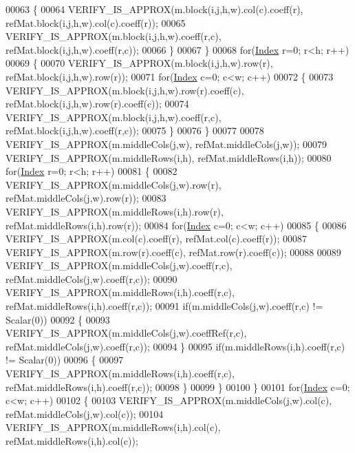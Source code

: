 \begin{DoxyCode}
00063         \{
00064           VERIFY\_IS\_APPROX(m.block(i,j,h,w).col(c).coeff(r), refMat.block(i,j,h,w).col(c).coeff(r));
00065           VERIFY\_IS\_APPROX(m.block(i,j,h,w).coeff(r,c), refMat.block(i,j,h,w).coeff(r,c));
00066         \}
00067       \}
00068       \textcolor{keywordflow}{for}(\hyperlink{namespace_eigen_a62e77e0933482dafde8fe197d9a2cfde}{Index} r=0; r<h; r++)
00069       \{
00070         VERIFY\_IS\_APPROX(m.block(i,j,h,w).row(r), refMat.block(i,j,h,w).row(r));
00071         \textcolor{keywordflow}{for}(\hyperlink{namespace_eigen_a62e77e0933482dafde8fe197d9a2cfde}{Index} c=0; c<w; c++)
00072         \{
00073           VERIFY\_IS\_APPROX(m.block(i,j,h,w).row(r).coeff(c), refMat.block(i,j,h,w).row(r).coeff(c));
00074           VERIFY\_IS\_APPROX(m.block(i,j,h,w).coeff(r,c), refMat.block(i,j,h,w).coeff(r,c));
00075         \}
00076       \}
00077       
00078       VERIFY\_IS\_APPROX(m.middleCols(j,w), refMat.middleCols(j,w));
00079       VERIFY\_IS\_APPROX(m.middleRows(i,h), refMat.middleRows(i,h));
00080       \textcolor{keywordflow}{for}(\hyperlink{namespace_eigen_a62e77e0933482dafde8fe197d9a2cfde}{Index} r=0; r<h; r++)
00081       \{
00082         VERIFY\_IS\_APPROX(m.middleCols(j,w).row(r), refMat.middleCols(j,w).row(r));
00083         VERIFY\_IS\_APPROX(m.middleRows(i,h).row(r), refMat.middleRows(i,h).row(r));
00084         \textcolor{keywordflow}{for}(\hyperlink{namespace_eigen_a62e77e0933482dafde8fe197d9a2cfde}{Index} c=0; c<w; c++)
00085         \{
00086           VERIFY\_IS\_APPROX(m.col(c).coeff(r), refMat.col(c).coeff(r));
00087           VERIFY\_IS\_APPROX(m.row(r).coeff(c), refMat.row(r).coeff(c));
00088           
00089           VERIFY\_IS\_APPROX(m.middleCols(j,w).coeff(r,c), refMat.middleCols(j,w).coeff(r,c));
00090           VERIFY\_IS\_APPROX(m.middleRows(i,h).coeff(r,c), refMat.middleRows(i,h).coeff(r,c));
00091           \textcolor{keywordflow}{if}(m.middleCols(j,w).coeff(r,c) != Scalar(0))
00092           \{
00093             VERIFY\_IS\_APPROX(m.middleCols(j,w).coeffRef(r,c), refMat.middleCols(j,w).coeff(r,c));
00094           \}
00095           \textcolor{keywordflow}{if}(m.middleRows(i,h).coeff(r,c) != Scalar(0))
00096           \{
00097             VERIFY\_IS\_APPROX(m.middleRows(i,h).coeff(r,c), refMat.middleRows(i,h).coeff(r,c));
00098           \}
00099         \}
00100       \}
00101       \textcolor{keywordflow}{for}(\hyperlink{namespace_eigen_a62e77e0933482dafde8fe197d9a2cfde}{Index} c=0; c<w; c++)
00102       \{
00103         VERIFY\_IS\_APPROX(m.middleCols(j,w).col(c), refMat.middleCols(j,w).col(c));
00104         VERIFY\_IS\_APPROX(m.middleRows(i,h).col(c), refMat.middleRows(i,h).col(c));

\end{DoxyCode}
